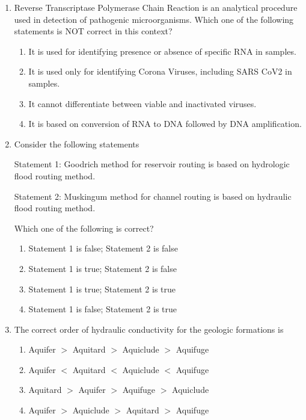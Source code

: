 \documentclass[12pt,a4paper]{article}
\begin{document}
\begin{enumerate}
   \item Reverse Transcriptase Polymerase Chain Reaction is an analytical procedure used in detection of pathogenic microorganisms. Which one of the following statements is NOT correct in this context?
         \begin{enumerate}
            \item It is used for identifying presence or absence of specific RNA in samples.
            \item It is used only for identifying Corona Viruses, including SARS CoV2 in samples.
            \item It cannot differentiate between viable and inactivated viruses.
            \item It is based on conversion of RNA to DNA followed by DNA amplification.
         \end{enumerate}

   \item Consider the following statements

         Statement 1: Goodrich method for reservoir routing is based on hydrologic flood routing method.

         Statement 2: Muskingum method for channel routing is based on hydraulic flood routing method.

         Which one of the following is correct?
         \begin{enumerate}
            \item Statement 1 is false; Statement 2 is false
            \item Statement 1 is true; Statement 2 is false
            \item Statement 1 is true; Statement 2 is true
            \item Statement 1 is false; Statement 2 is true
         \end{enumerate}

   \item The correct order of hydraulic conductivity for the geologic formations is
         \begin{enumerate}
            \item Aquifer $>$ Aquitard $>$ Aquiclude $>$ Aquifuge
            \item Aquifer $<$ Aquitard $<$ Aquiclude $<$ Aquifuge
            \item Aquitard $>$ Aquifer $>$ Aquifuge $>$ Aquiclude
            \item Aquifer $>$ Aquiclude $>$ Aquitard $>$ Aquifuge
         \end{enumerate}


\end{enumerate}
\end{document}
